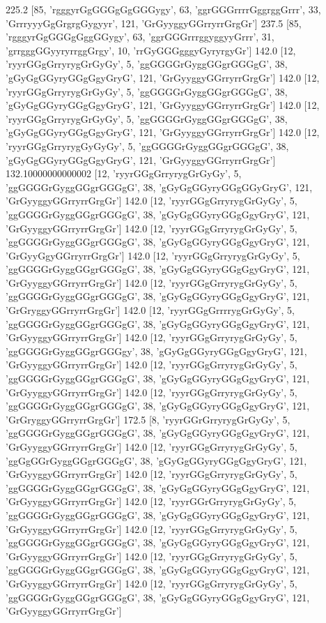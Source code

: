 225.2 [85, 'rgggyrGgGGGgGgGGGygy', 63, 'ggrGGGrrrrGggrggGrrr', 33, 'GrrryyyGgGrgrgGygyyr', 121, 'GrGyyggyGGrryrrGrgGr']
237.5 [85, 'rgggyrGgGGGgGggGGygy', 63, 'ggrGGGrrrggyggyyGrrr', 31, 'grrgggGGyyryrrggGrgy', 10, 'rrGyGGGgggyGyryrgyGr']
142.0 [12, 'ryyrGGgGrryrygGrGyGy', 5, 'ggGGGGrGyggGGgrGGGgG', 38, 'gGyGgGGyryGGgGgyGryG', 121, 'GrGyyggyGGrryrrGrgGr']
142.0 [12, 'ryyrGGgGrryrygGrGyGy', 5, 'ggGGGGrGyggGGgrGGGgG', 38, 'gGyGgGGyryGGgGgyGryG', 121, 'GrGyyggyGGrryrrGrgGr']
142.0 [12, 'ryyrGGgGrryrygGrGyGy', 5, 'ggGGGGrGyggGGgrGGGgG', 38, 'gGyGgGGyryGGgGgyGryG', 121, 'GrGyyggyGGrryrrGrgGr']
142.0 [12, 'ryyrGGgGrryrygGyGyGy', 5, 'ggGGGGrGyggGGgrGGGgG', 38, 'gGyGgGGyryGGgGgyGryG', 121, 'GrGyyggyGGrryrrGrgGr']
132.10000000000002 [12, 'ryyrGGgGrryrygGrGyGy', 5, 'ggGGGGrGyggGGgrGGGgG', 38, 'gGyGgGGyryGGgGGyGryG', 121, 'GrGyyggyGGrryrrGrgGr']
142.0 [12, 'ryyrGGgGrryrygGrGyGy', 5, 'ggGGGGrGyggGGgrGGGgG', 38, 'gGyGgGGyryGGgGgyGryG', 121, 'GrGyyggyGGrryrrGrgGr']
142.0 [12, 'ryyrGGgGrryrygGrGyGy', 5, 'ggGGGGrGyggGGgrGGGgG', 38, 'gGyGgGGyryGGgGgyGryG', 121, 'GrGyyGgyGGrryrrGrgGr']
142.0 [12, 'ryyrGGgGrryrygGrGyGy', 5, 'ggGGGGrGyggGGgrGGGgG', 38, 'gGyGgGGyryGGgGgyGryG', 121, 'GrGyyggyGGrryrrGrgGr']
142.0 [12, 'ryyrGGgGrryrygGrGyGy', 5, 'ggGGGGrGyggGGgrGGGgG', 38, 'gGyGgGGyryGGgGgyGryG', 121, 'GrGryggyGGrryrrGrgGr']
142.0 [12, 'ryyrGGgGrrrrygGrGyGy', 5, 'ggGGGGrGyggGGgrGGGgG', 38, 'gGyGgGGyryGGgGgyGryG', 121, 'GrGyyggyGGrryrrGrgGr']
142.0 [12, 'ryyrGGgGrryrygGrGyGy', 5, 'ggGGGGrGyggGGgrGGGgy', 38, 'gGyGgGGyryGGgGgyGryG', 121, 'GrGyyggyGGrryrrGrgGr']
142.0 [12, 'ryyrGGgGrryrygGrGyGy', 5, 'ggGGGGrGyggGGgrGGGgG', 38, 'gGyGgGGyryGGgGgyGryG', 121, 'GrGyyggyGGrryrrGrgGr']
142.0 [12, 'ryyrGGgGrryrygGrGyGy', 5, 'ggGGGGrGyggGGgrGGGgG', 38, 'gGyGgGGyryGGgGgyGryG', 121, 'GrGryggyGGrryrrGrgGr']
172.5 [8, 'ryyrGGrGrryrygGrGyGy', 5, 'ggGGGGrGyggGGgrGGGgG', 38, 'gGyGgGGyryGGgGgyGryG', 121, 'GrGyyggyGGrryrrGrgGr']
142.0 [12, 'ryyrGGgGrryrygGrGyGy', 5, 'ggGgGGrGyggGGgrGGGgG', 38, 'gGyGgGGyryGGgGgyGryG', 121, 'GrGyyggyGGrryrrGrgGr']
142.0 [12, 'ryyrGGgGrryrygGrGyGy', 5, 'ggGGGGrGyggGGgrGGGgG', 38, 'gGyGgGGyryGGgGgyGryG', 121, 'GrGyyggyGGrryrrGrgGr']
142.0 [12, 'ryyrGGrGrryrygGrGyGy', 5, 'ggGGGGrGyggGGgrGGGgG', 38, 'gGyGgGGyryGGgGgyGryG', 121, 'GrGyyggyGGrryrrGrgGr']
142.0 [12, 'ryyrGGgGrryrygGrGyGy', 5, 'ggGGGGrGyggGGgrGGGgG', 38, 'gGyGgGGyryGGgGgyGryG', 121, 'GrGyyggyGGrryrrGrgGr']
142.0 [12, 'ryyrGGgGrryrygGrGyGy', 5, 'ggGGGGrGyggGGgrGGGgG', 38, 'gGyGgGGyryGGgGgyGryG', 121, 'GrGyyggyGGrryrrGrgGr']
142.0 [12, 'ryyrGGgGrryrygGrGyGy', 5, 'ggGGGGrGyggGGgrGGGgG', 38, 'gGyGgGGyryGGgGgyGryG', 121, 'GrGyyggyGGrryrrGrgGr']

